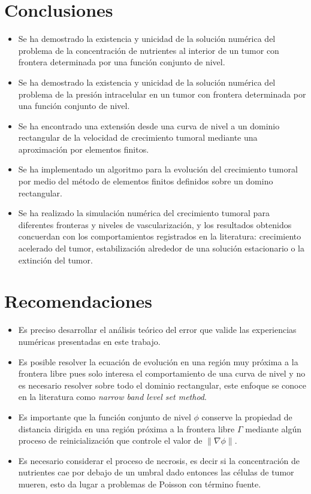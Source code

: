 \section{Conclusiones}
\begin{itemize}
	\item Se ha demostrado la existencia y unicidad de la solución numérica del problema de la concentración de nutrientes al interior de un tumor con frontera determinada por una función conjunto de nivel.
	\item Se ha demostrado la existencia y unicidad de la solución numérica del problema de la presión intracelular en un tumor con frontera determinada por una función conjunto de nivel.
	\item Se ha encontrado una extensión desde una curva de nivel a un dominio rectangular de la velocidad de crecimiento tumoral mediante una aproximación por elementos finitos. 
	\item Se ha implementado un algoritmo para la evolución del crecimiento tumoral por medio del método de elementos finitos definidos sobre un domino rectangular.
	\item Se ha realizado la simulación numérica del crecimiento tumoral para diferentes fronteras y niveles de vascularización, y los resultados obtenidos concuerdan con los comportamientos registrados en la literatura: crecimiento acelerado del tumor, estabilización alrededor de una solución estacionario o la extinción del tumor. 
\end{itemize}
\section{Recomendaciones}
\begin{itemize}
	\item Es preciso desarrollar el análisis teórico del error que valide las experiencias numéricas presentadas en este trabajo.
	\item Es posible resolver la ecuación de evolución  en una región muy próxima a la frontera libre pues solo interesa el comportamiento de una curva de nivel y no es necesario resolver sobre todo el dominio rectangular, este enfoque se conoce en la literatura como \emph{narrow band level set method}.
	\item Es importante que la función conjunto de nivel  $\phi$ conserve la propiedad de distancia dirigida en una región próxima a la frontera libre $\Gamma$ mediante algún proceso de reinicialización que controle el valor de $\|\nabla \phi \|$.
	\item Es necesario considerar el proceso de necrosis, es decir si la concentración de nutrientes cae por debajo de un umbral dado entonces las células de tumor mueren, esto da lugar a problemas de Poisson con término fuente. 
\end{itemize}
